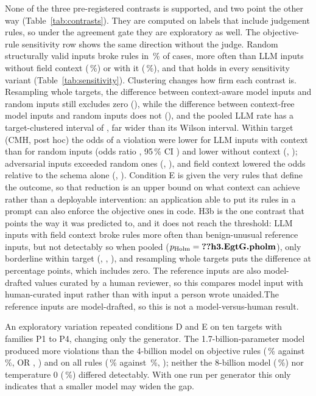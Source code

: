 \documentclass[journal]{IEEEtran}
\begin{document}
None of the three pre-registered contrasts is supported, and two point the other way
(Table~\ref{tab:contrasts}).\ifjudgeweak{} They are computed on labels that include judgement rules, so under the
agreement gate they are exploratory as well. The objective-rule sensitivity row shows the same
direction without the judge.\fi{} Random structurally valid inputs broke rules in \,\% of
cases, more often than LLM inputs without field context (\,\%) or with it
(\,\%), and that holds in every sensitivity variant (Table~\ref{tab:sensitivity}).
Clustering changes how firm each contrast is. Resampling whole targets, the difference between
context-aware model inputs and random inputs still excludes zero (), while the
difference between context-free model inputs and random inputs does not (), and
the pooled LLM rate has a target-clustered interval of , far wider than its Wilson
interval. Within
target (CMH, post hoc) the odds of a violation were lower for LLM inputs with context than for random
inputs (odds ratio , 95\,\% CI ) and lower without context
(, ); adversarial inputs exceeded random ones (,
), and field context lowered the odds relative to the schema alone (,
). Condition E is given the very rules that define the outcome, so that reduction is an
upper bound on what context can achieve rather than a deployable intervention: an application able to
put its rules in a prompt can also enforce the objective ones in code. H3b is the one contrast that points the way it was predicted to, and it does not reach the
threshold: LLM inputs with field context broke rules more often than benign-unusual reference inputs,
but not detectably so when pooled ($p_{\mathrm{Holm}}=\R{h3.EgtG.pholm}$), only borderline within
target (, , ), and resampling whole targets puts the
difference at  percentage points, which includes zero. \ifreviewed The reference
inputs are also model-drafted values curated by a human reviewer, so this compares model input with
human-curated input rather than with input a person wrote unaided.\else The reference inputs are
model-drafted, so this is not a model-versus-human result.\fi{}

An exploratory variation repeated conditions D and E on ten targets with families P1 to P4, changing
only the generator. The 1.7-billion-parameter model produced more violations than the 4-billion model
on objective rules (\,\% against \,\%, OR ,
) and on all rules (\,\% against \,\%,
); neither the 8-billion model (\,\%) nor temperature 0
(\,\%) differed detectably. With one run per generator this only indicates that a
smaller model may widen the gap.
\end{document}
